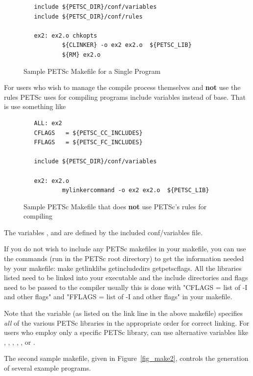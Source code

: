 {{{\begin{figure}[H]
{\begin{verbatim}
   include ${PETSC_DIR}/conf/variables
   include ${PETSC_DIR}/conf/rules

   ex2: ex2.o chkopts
           ${CLINKER} -o ex2 ex2.o  ${PETSC_LIB}
           ${RM} ex2.o
\end{verbatim}
}
\caption{Sample PETSc Makefile for a Single Program}
\label{fig_make1}
\end{figure}

For users who wish to manage the compile process themselves
and {\bf not} use the rules PETSc uses for compiling programs
include variables instead of base. That is use something like

\begin{figure}[H]
{\small
\begin{verbatim}
   ALL: ex2
   CFLAGS   = ${PETSC_CC_INCLUDES}
   FFLAGS   = ${PETSC_FC_INCLUDES}

   include ${PETSC_DIR}/conf/variables

   ex2: ex2.o
           mylinkercommand -o ex2 ex2.o  ${PETSC_LIB}
\end{verbatim}
}
\caption{Sample PETSc Makefile that does {\bf not} use PETSc's rules for compiling}
\label{fig_make1}
\end{figure}
The variables , 
and  are defined by the included conf/variables file.

If you do not wish to include any PETSc makefiles in your makefile,
you can use the commands (run in the PETSc root directory) to get the information
needed by your makefile: make getlinklibs getincludedirs getpetscflags.
All the libraries listed need to be linked into your executable and the 
include directories and flags need to be passed to the compiler usually
this is done with "CFLAGS = list of -I and other flags" and
"FFLAGS = list of -I and other flags" in your makefile.



 
Note that the variable  (as listed on the link
line in the above makefile) specifies {\em all} of the various PETSc
libraries in the appropriate order for correct linking.  For users who
employ only a specific PETSc library, can use alternative variables
like  , , 
, ,
,  or
.

The second sample makefile, given in Figure~\ref{fig_make2},
controls the generation of several example programs. 

}}}
